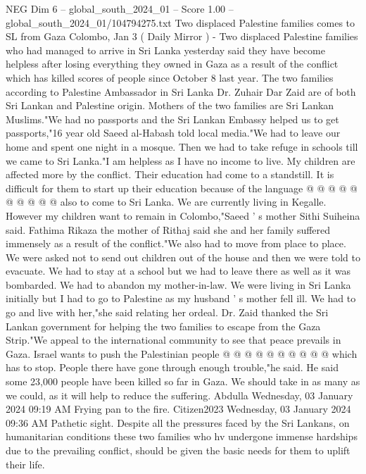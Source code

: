 \begin{textsample}{NEG Dim 6 – global\_south\_2024\_01 – Score 1.00 – global\_south\_2024\_01/104794275.txt}  \label{ex:f6_neg_355}
Two displaced Palestine families comes to SL from Gaza Colombo, Jan 3 ( Daily Mirror ) - Two displaced Palestine families who had managed to arrive in Sri Lanka yesterday said they have become helpless after losing everything they owned in Gaza as a result of the conflict which has killed scores of people since October 8 last year.
The two families according to Palestine Ambassador in Sri Lanka Dr.
Zuhair Dar Zaid are of both Sri Lankan and Palestine origin.
Mothers of the two families are Sri Lankan Muslims."We had no passports and the Sri Lankan Embassy helped us to get passports,"16 year old Saeed al-Habash told local media."We had to leave our home and spent one night in a mosque.
Then we had to take refuge in schools till we came to Sri Lanka."I am helpless as I have no income to live.
My children are affected more by the conflict.
Their education had come to a standstill.
It is difficult for them to start up their education because of the language @ @ @ @ @ @ @ @ @ @ also to come to Sri Lanka.
We are currently living in Kegalle.
However my children want to remain in Colombo,"Saeed ' s mother Sithi Suiheina said.
Fathima Rikaza the mother of Rithaj said she and her family suffered immensely as a result of the conflict."We also had to move from place to place.
We were asked not to send out children out of the house and then we were told to evacuate.
We had to stay at a school but we had to leave there as well as it was bombarded.
We had to abandon my mother-in-law.
We were living in Sri Lanka initially but I had to go to Palestine as my husband ' s mother fell ill.
We had to go and live with her,"she said relating her ordeal.
Dr.
Zaid thanked the Sri Lankan government for helping the two families to escape from the Gaza Strip."We appeal to the international community to see that peace prevails in Gaza.
Israel wants to push the Palestinian people @ @ @ @ @ @ @ @ @ @ which has to stop.
People there have gone through enough trouble,"he said.
He said some 23,000 people have been killed so far in Gaza.
We should take in as many as we could, as it will help to reduce the suffering.
Abdulla Wednesday, 03 January 2024 09:19 AM Frying pan to the fire.
Citizen2023 Wednesday, 03 January 2024 09:36 AM Pathetic sight.
Despite all the pressures faced by the Sri Lankans, on humanitarian conditions these two families who hv undergone immense hardships due to the prevailing conflict, should be given the basic needs for them to uplift their life.

\end{textsample}
